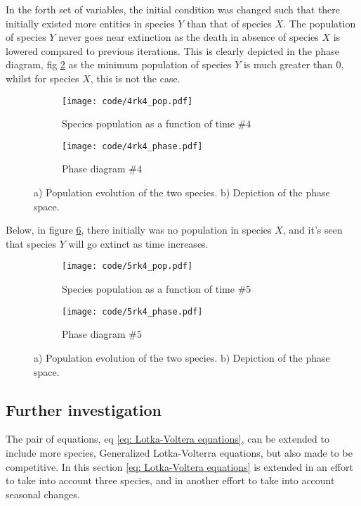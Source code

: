 \documentclass[a4paper]{article}
\newcommand{\newparagraph}{\vspace{.5cm}\noindent}
\begin{document}
\newparagraph
In the forth set of variables, the initial condition was changed such that there initially existed more entities in species $Y$ than that of species $X$. The population of species $Y$ never goes near extinction as the death in absence of species $X$ is lowered compared to previous iterations. This is clearly depicted in the phase diagram, fig \ref{fig: param 4 phase} as the minimum population of species $Y$ is much greater than 0, whilst for species $X$, this is not the case.
\begin{figure}[H]
    \centering
    \begin{subfigure}{0.45\textwidth}
        \texttt{[image: code/4rk4\_pop.pdf]}
        \caption{Species population as a function of time $\#4$}
        \label{fig: param 4 pop}
    \end{subfigure}
    \hfill    
    \begin{subfigure}{0.45\textwidth}
        \texttt{[image: code/4rk4\_phase.pdf]}
        \caption{Phase diagram $\#4$}
        \label{fig: param 4 phase}
    \end{subfigure}
    \caption{a) Population evolution of the two species. b) Depiction of the phase space.}
    \label{fig: param 4}
\end{figure}\noindent
Below, in figure \ref{fig: param 5}, there initially was no population in species $X$, and it's seen that species $Y$ will go extinct as time increases.
\begin{figure}[H]
    \centering
    \begin{subfigure}{0.45\textwidth}
        \texttt{[image: code/5rk4\_pop.pdf]}
        \caption{Species population as a function of time $\#5$}
        \label{fig: param 5 pop}
    \end{subfigure}
    \hfill    
    \begin{subfigure}{0.45\textwidth}
        \texttt{[image: code/5rk4\_phase.pdf]}
        \caption{Phase diagram $\#5$}
        \label{fig: param 5 phase}
    \end{subfigure}
    \caption{a) Population evolution of the two species. b) Depiction of the phase space.}
    \label{fig: param 5}
\end{figure}

\subsection{Further investigation}
The pair of equations, eq \eqref{eq: Lotka-Voltera equations}, can be extended to include more species, Generalized Lotka-Volterra equations, but also made to be competitive. In this section \eqref{eq: Lotka-Voltera equations} is extended in an effort to take into account three species, and in another effort to take into account seasonal changes.
\end{document}
